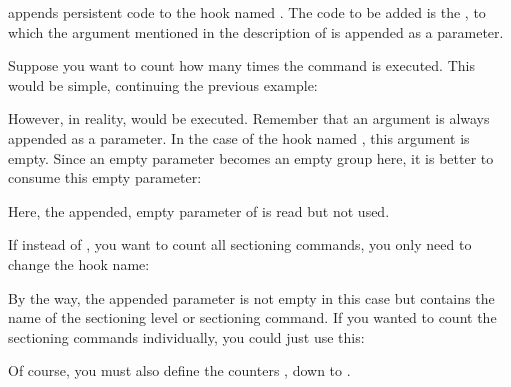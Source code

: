 \begin{Declaration}
\end{Declaration}
 appends
persistent code to the hook named . The code to be added is the
, to which the argument mentioned in the description of
 is appended as a parameter.
\begin{Example}
  Suppose you want to count how many times the  command is
  executed. This would be simple, continuing the previous example:
\begin{lstcode}
              {}
\end{lstcode}
  However, in reality, %
  \PParameter{} would be executed. Remember that an argument is always appended
  as a parameter. In the case of the hook named
  , this argument is empty. Since an empty
  parameter becomes an empty group here, it is better to consume this empty
  parameter:
\begin{lstcode}
  \newcommand*{\stepcountergobble}[2]{%
    \stepcounter{#1}%
  }
              {}
\end{lstcode}
  Here, the appended, empty parameter of  is read but
  not used.
  
  If instead of , you want to count all sectioning commands, you
  only need to change the hook name:
\begin{lstcode}
              {}
\end{lstcode}
  By the way, the appended parameter is not empty in this case but contains the
  name of the sectioning level or sectioning command. If you wanted to count
  the sectioning commands individually, you could just use this:
\begin{lstcode}
  \newcommand*{\stepCounter}[1]{%
    \stepcounter{#1Counter}%
  }
              {\stepCounter}
\end{lstcode}
  Of course, you must also define the counters ,
   down to .
\end{Example}


